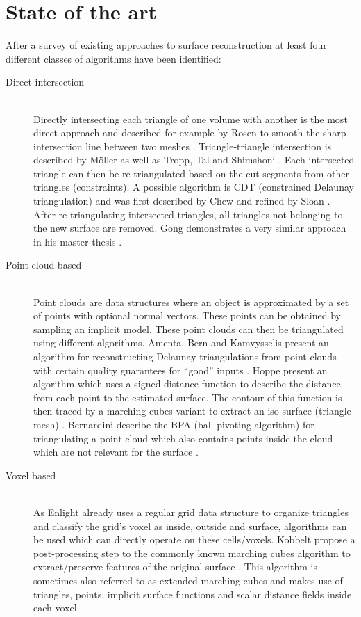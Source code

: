 
\section{State of the art}

After a survey of existing approaches to surface reconstruction at least four different classes of algorithms have been identified:

\begin{description}
	
\item[Direct intersection] \hfill \\
Directly intersecting each triangle of one volume with another is the most direct approach and described for example by Rosen to smooth the sharp intersection line between two meshes \cite{mesh_intersection}. Triangle-triangle intersection is described by M\"oller \cite{tri_tri_intersection_moller} as well as Tropp, Tal and Shimshoni \cite{tri_tri_intersection_2}. Each intersected triangle can then be re-triangulated based on the cut segments from other triangles (constraints). A possible algorithm is CDT (constrained Delaunay triangulation) and was first described by Chew \cite{CDT} and refined by Sloan \cite{CDT_fast}. After re-triangulating intersected triangles, all triangles not belonging to the new surface are removed. Gong demonstrates a very similar approach in his master thesis \cite{cutter_workpiece_engagement}.

\item[Point cloud based] \hfill \\
Point clouds are data structures where an object is approximated by a set of points with optional normal vectors. These points can be obtained \eg by sampling an implicit model. These point clouds can then be triangulated using different algorithms. 
Amenta, Bern and Kamvysselis present an algorithm for reconstructing Delaunay triangulations from point clouds with certain quality guarantees for \enquote{good} inputs \cite{vornoi_surface_reconstruction}.
Hoppe \etal present an algorithm which uses a signed distance function to describe the distance from each point to the estimated surface. The contour of this function is then traced by a marching cubes variant to extract an iso surface (triangle mesh) \cite{surface_reconstruction}.
Bernardini \etal describe the BPA (ball-pivoting algorithm) for triangulating a point cloud which also contains points inside the cloud which are not relevant for the surface \cite{BPA}.


\item[Voxel based] \hfill \\
As Enlight already uses a regular grid data structure to organize triangles and classify the grid's voxel as inside, outside and surface, algorithms can be used which can directly operate on these cells/voxels.
Kobbelt \etal propose a post-processing step to the commonly known marching cubes algorithm to extract/preserve features of the original surface \cite{extended_marching_cubes}. This algorithm is sometimes also referred to as extended marching cubes and makes use of triangles, points, implicit surface functions and scalar distance fields inside each voxel.



\end{description}
